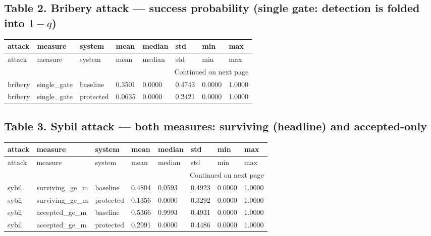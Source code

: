 \documentclass[11pt,a4paper]{article}
\begin{document}
\subsection*{Table 2. Bribery attack --- success probability (single gate: detection is folded into $1-q$)}
{\scriptsize
\setlength{\tabcolsep}{3pt}
\begin{longtable}{llllllll}
\toprule
attack & measure & system & mean & median & std & min & max \\
\midrule
\endfirsthead
\toprule
attack & measure & system & mean & median & std & min & max \\
\midrule
\endhead
\midrule
\multicolumn{8}{r}{Continued on next page} \\
\midrule
\endfoot
\bottomrule
\endlastfoot
bribery & single\_gate & baseline & 0.3501 & 0.0000 & 0.4743 & 0.0000 & 1.0000 \\
bribery & single\_gate & protected & 0.0635 & 0.0000 & 0.2421 & 0.0000 & 1.0000 \\
\end{longtable}

}
\vspace{8pt}
\subsection*{Table 3. Sybil attack --- both measures: surviving (headline) and accepted-only}
{\scriptsize
\setlength{\tabcolsep}{3pt}
\begin{longtable}{llllllll}
\toprule
attack & measure & system & mean & median & std & min & max \\
\midrule
\endfirsthead
\toprule
attack & measure & system & mean & median & std & min & max \\
\midrule
\endhead
\midrule
\multicolumn{8}{r}{Continued on next page} \\
\midrule
\endfoot
\bottomrule
\endlastfoot
sybil & surviving\_ge\_m & baseline & 0.4804 & 0.0593 & 0.4923 & 0.0000 & 1.0000 \\
sybil & surviving\_ge\_m & protected & 0.1356 & 0.0000 & 0.3292 & 0.0000 & 1.0000 \\
sybil & accepted\_ge\_m & baseline & 0.5366 & 0.9993 & 0.4931 & 0.0000 & 1.0000 \\
sybil & accepted\_ge\_m & protected & 0.2991 & 0.0000 & 0.4486 & 0.0000 & 1.0000 \\
\end{longtable}

}
\vspace{8pt}
\end{document}
